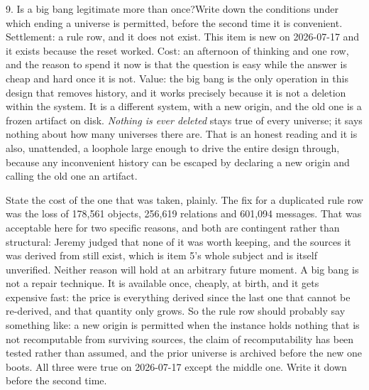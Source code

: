 \begin{Open}{9. Is a big bang legitimate more than once?}{Write down the conditions under which ending a universe is permitted, before the second time it is convenient.}
Settlement: a rule row, and it does not exist. This item is new on 2026-07-17 and it exists because the reset worked. Cost: an afternoon of thinking and one row, and the reason to spend it now is that the question is easy while the answer is cheap and hard once it is not. Value: the big bang is the only operation in this design that removes history, and it works precisely because it is not a deletion within the system. It is a different system, with a new origin, and the old one is a frozen artifact on disk. \textit{Nothing is ever deleted} stays true of every universe; it says nothing about how many universes there are. That is an honest reading and it is also, unattended, a loophole large enough to drive the entire design through, because any inconvenient history can be escaped by declaring a new origin and calling the old one an artifact.

State the cost of the one that was taken, plainly. The fix for a duplicated rule row was the loss of 178,561 objects, 256,619 relations and 601,094 messages. That was acceptable here for two specific reasons, and both are contingent rather than structural: Jeremy judged that none of it was worth keeping, and the sources it was derived from still exist, which is item 5's whole subject and is itself unverified. Neither reason will hold at an arbitrary future moment. A big bang is not a repair technique. It is available once, cheaply, at birth, and it gets expensive fast: the price is everything derived since the last one that cannot be re-derived, and that quantity only grows. So the rule row should probably say something like: a new origin is permitted when the instance holds nothing that is not recomputable from surviving sources, the claim of recomputability has been tested rather than assumed, and the prior universe is archived before the new one boots. All three were true on 2026-07-17 except the middle one. Write it down before the second time.
\end{Open}

